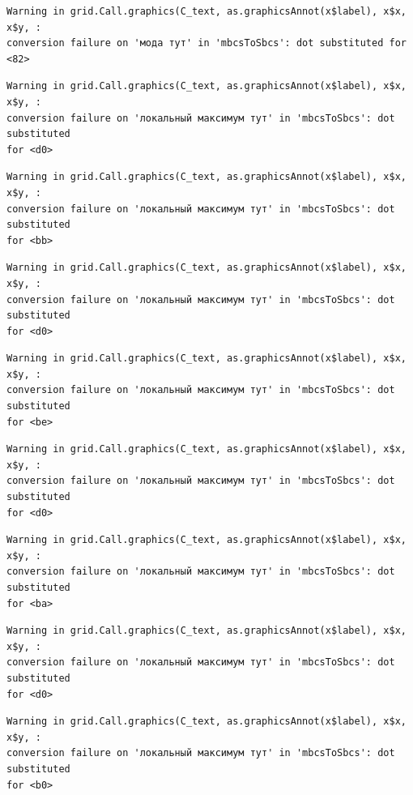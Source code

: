 \documentclass[
  letterpaper,
  DIV=11,
  numbers=noendperiod]{scrreprt}
\theoremstyle{definition}
\theoremstyle{remark}
\begin{document}
\begin{verbatim}
Warning in grid.Call.graphics(C_text, as.graphicsAnnot(x$label), x$x, x$y, :
conversion failure on 'мода тут' in 'mbcsToSbcs': dot substituted for <82>
\end{verbatim}

\begin{verbatim}
Warning in grid.Call.graphics(C_text, as.graphicsAnnot(x$label), x$x, x$y, :
conversion failure on 'локальный максимум тут' in 'mbcsToSbcs': dot substituted
for <d0>
\end{verbatim}

\begin{verbatim}
Warning in grid.Call.graphics(C_text, as.graphicsAnnot(x$label), x$x, x$y, :
conversion failure on 'локальный максимум тут' in 'mbcsToSbcs': dot substituted
for <bb>
\end{verbatim}

\begin{verbatim}
Warning in grid.Call.graphics(C_text, as.graphicsAnnot(x$label), x$x, x$y, :
conversion failure on 'локальный максимум тут' in 'mbcsToSbcs': dot substituted
for <d0>
\end{verbatim}

\begin{verbatim}
Warning in grid.Call.graphics(C_text, as.graphicsAnnot(x$label), x$x, x$y, :
conversion failure on 'локальный максимум тут' in 'mbcsToSbcs': dot substituted
for <be>
\end{verbatim}

\begin{verbatim}
Warning in grid.Call.graphics(C_text, as.graphicsAnnot(x$label), x$x, x$y, :
conversion failure on 'локальный максимум тут' in 'mbcsToSbcs': dot substituted
for <d0>
\end{verbatim}

\begin{verbatim}
Warning in grid.Call.graphics(C_text, as.graphicsAnnot(x$label), x$x, x$y, :
conversion failure on 'локальный максимум тут' in 'mbcsToSbcs': dot substituted
for <ba>
\end{verbatim}

\begin{verbatim}
Warning in grid.Call.graphics(C_text, as.graphicsAnnot(x$label), x$x, x$y, :
conversion failure on 'локальный максимум тут' in 'mbcsToSbcs': dot substituted
for <d0>
\end{verbatim}

\begin{verbatim}
Warning in grid.Call.graphics(C_text, as.graphicsAnnot(x$label), x$x, x$y, :
conversion failure on 'локальный максимум тут' in 'mbcsToSbcs': dot substituted
for <b0>
\end{verbatim}
\end{document}
